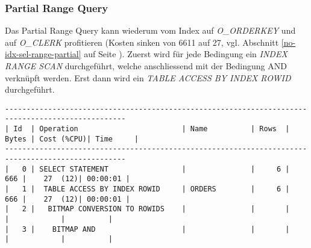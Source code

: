 \documentclass[11pt,a4paper,parskip=half]{scrartcl}
\begin{document}
\subsubsection{Partial Range Query}
Das Partial Range Query kann wiederum vom Index auf \emph{O\_ORDERKEY} und auf \emph{O\_CLERK} profitieren (Kosten sinken von 6611 auf 27, vgl. Abschnitt \ref{no-idx-sel-range-partial} auf Seite \pageref{no-idx-sel-range-partial}). Zuerst wird für jede Bedingung ein \emph{INDEX RANGE SCAN} durchgeführt, welche anschliessend mit der Bedingung AND verknüpft werden. Erst dann wird ein \emph{TABLE ACCESS BY INDEX ROWID} durchgeführt.
\begin{lstlisting}
--------------------------------------------------------------------------------------------------                                                                                                                                                                                                           
| Id  | Operation                        | Name          | Rows  | Bytes | Cost (%CPU)| Time     |                                                                                                                                                                                                           
--------------------------------------------------------------------------------------------------                                                                                                                                                                                                           
|   0 | SELECT STATEMENT                 |               |     6 |   666 |    27  (12)| 00:00:01 |                                                                                                                                                                                                           
|   1 |  TABLE ACCESS BY INDEX ROWID     | ORDERS        |     6 |   666 |    27  (12)| 00:00:01 |                                                                                                                                                                                                           
|   2 |   BITMAP CONVERSION TO ROWIDS    |               |       |       |            |          |                                                                                                                                                                                                           
|   3 |    BITMAP AND                    |               |       |       |            |          |                                                                                                                                                                                                           

\end{lstlisting}
\end{document}
